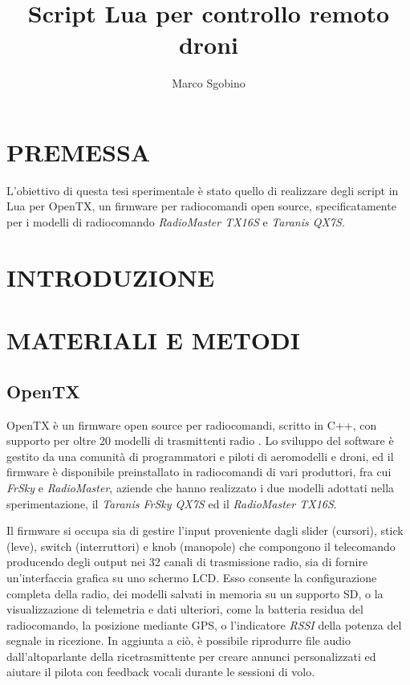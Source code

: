 \documentclass[a4paper, 12pt]{report}
\begin{document}
\title{Script Lua per controllo remoto droni}
\author{Marco Sgobino}
\maketitle %
\tableofcontents %
\fontsize{12pt}{14pt}\selectfont
{} %

\chapter{PREMESSA}
L'obiettivo di questa tesi sperimentale è stato quello di realizzare degli script in Lua per OpenTX, un firmware per radiocomandi open source, specificatamente per i modelli di radiocomando \emph{RadioMaster TX16S} e \emph{Taranis QX7S}.


\chapter{INTRODUZIONE}
\chapter{MATERIALI E METODI}
        \section{OpenTX}

        OpenTX \cite{opentx-github} è un firmware open source per radiocomandi, scritto in C++, con supporto per oltre 20 modelli di trasmittenti radio \cite{opentx-radios}.
        Lo sviluppo del software è gestito da una comunità di programmatori e piloti di aeromodelli e droni, ed il firmware è disponibile preinstallato in radiocomandi di vari produttori, fra cui \emph{FrSky} e \emph{RadioMaster}, aziende che hanno realizzato i due modelli adottati nella sperimentazione, il \emph{Taranis FrSky QX7S} ed il \emph{RadioMaster TX16S}.

        Il firmware si occupa sia di gestire l'input proveniente dagli slider (cursori), stick (leve), switch (interruttori) e knob (manopole) che compongono il telecomando producendo degli output nei 32 canali di trasmissione radio, sia di fornire un'interfaccia grafica su uno schermo LCD. Esso consente la configurazione completa della radio, dei modelli salvati in memoria su un supporto SD, o la visualizzazione di telemetria e dati ulteriori, come la batteria residua del radiocomando, la posizione mediante GPS, o l'indicatore \emph{RSSI} della potenza del segnale in ricezione. In aggiunta a ciò, è possibile riprodurre file audio dall'altoparlante della ricetrasmittente per creare annunci personalizzati ed aiutare il pilota con feedback vocali durante le sessioni di volo.
\end{document}
